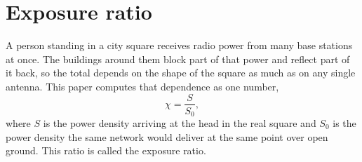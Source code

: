 %
%
%
%
%
%

\section{Exposure ratio}
\label{sec:ratio}

A person standing in a city square receives radio power from many base stations
at once. The buildings around them block part of that power and reflect part of
it back, so the total depends on the shape of the square as much as on any
single antenna. This paper computes that dependence as one number,
\begin{equation}
  \chi = \frac{S}{S_0} ,
  \label{eq:chidef}
\end{equation}
where $S$ is the power density arriving at the head in the real square and $S_0$
is the power density the same network would deliver at the same point over open
ground. This ratio is called the exposure ratio.


